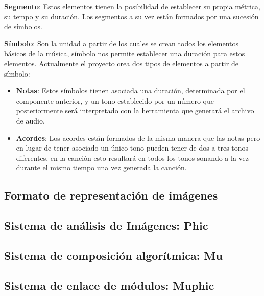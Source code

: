 \textbf{Segmento}: Estos elementos tienen la posibilidad de establecer su propia métrica, su tempo y su duración. Los segmentos a su vez están formados por una sucesión de símbolos.
\newline

\textbf{Símbolo}: Son la unidad a partir de los cuales se crean todos los elementos básicos de la música, símbolo nos permite establecer una duración para estos elementos. Actualmente el proyecto crea dos tipos de elementos a partir de símbolo:
\begin{itemize}
\item \textbf{Notas}: Estos símbolos tienen asociada una duración, determinada por el componente anterior, y un tono establecido por un número que posteriormente será interpretado con la herramienta que generará el archivo de audio.
\item \textbf{Acordes}: Los acordes están formados de la misma manera que las notas pero en lugar de tener asociado un único tono pueden tener de dos a tres tonos diferentes, en la canción esto resultará en todos los tonos sonando a la vez durante el mismo tiempo una vez generada la canción.
\end{itemize}

\subsection{Formato de representación de imágenes}


\subsection{Sistema de análisis de Imágenes: Phic}


\subsection{Sistema de composición algorítmica: Mu}


\subsection{Sistema de enlace de módulos: Muphic}


